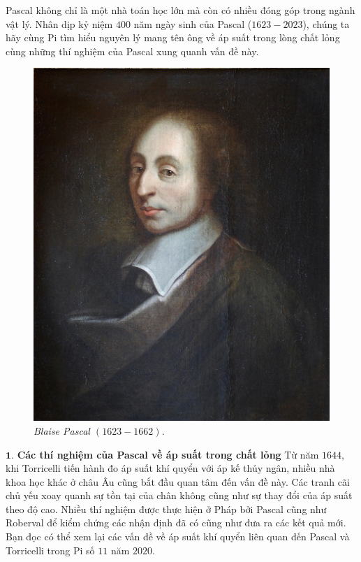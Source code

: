 \begin{multicols}{2}
	Pascal không chỉ là một nhà toán học lớn mà còn có nhiều đóng góp trong ngành vật lý. Nhân dịp kỷ niệm $400$ năm ngày sinh của Pascal ($1623-2023$), chúng ta hãy cùng Pi tìm hiểu nguyên lý mang tên ông về áp suất trong lòng chất lỏng cùng những thí nghiệm của Pascal xung quanh vấn đề này.
	\begin{figure}[H]
		\vspace*{-5pt}
		\centering
		\captionsetup{labelformat= empty, justification=centering}
		\includegraphics[width= 0.7\linewidth]{1}
		\caption{\small\textit{\color{timhieukhoahoc}Blaise Pascal $(1623-1662)$.}}
		\vspace*{-10pt}
	\end{figure}
	$\pmb{1.}$ \textbf{\color{timhieukhoahoc}Các thí nghiệm của Pascal về áp suất trong chất lỏng}
	\vskip 0.1cm
	Từ năm $1644$, khi Torricelli tiến hành đo áp suất khí quyển với áp kế thủy ngân, nhiều nhà khoa học khác ở châu Âu cũng bắt đầu quan tâm đến vấn đề này. Các tranh cãi chủ yếu xoay quanh sự tồn tại của chân không cũng như sự thay đổi của áp suất theo độ cao. Nhiều thí nghiệm được thực hiện ở Pháp bởi Pascal cũng như Roberval để kiểm chứng các nhận định đã có cũng như đưa ra các kết quả mới. Bạn đọc có thể xem lại các vấn đề về áp suất khí quyển liên quan đến Pascal và Torricelli trong Pi số $11$ năm $2020$.
	\begin{figure}[H]
		\vspace*{-5pt}
		\centering
		\captionsetup{labelformat= empty, justification=centering}

\end{figure}
\end{multicols}
